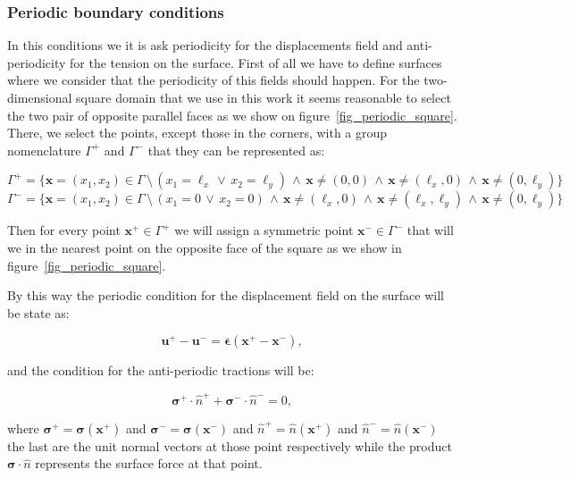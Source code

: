 \documentclass[preprint]{elsarticle}
\begin{document}
\subsubsection{Periodic boundary conditions}

In this conditions we it is ask periodicity for the displacements field and anti-periodicity for the tension on the
surface.
First of all we have to define surfaces where we consider that the periodicity of this fields should happen.
For the two-dimensional square domain that we use in this work it seems reasonable to select the two pair of opposite parallel faces 
as we show on figure~\ref{fig_periodic_square}.
There, we select the points, except those in the corners, with a group nomenclature $\Gamma^+$ and $\Gamma^-$ that they
can be represented as:

\begin{equation}
\Gamma^+ = \{ \bm{x} = (x_1, x_2) \in \Gamma \,\setminus\, (x_1 = \ell_x \,\vee\, x_2 = \ell_y) \,\wedge\,
\bm{x}\neq(0,0) \,\wedge\,  \bm{x}\neq(\ell_x,0) \,\wedge\, \bm{x}\neq(0,\ell_y) \}
\end{equation}
\begin{equation}
\Gamma^- = \{ \bm{x} = (x_1, x_2) \in \Gamma \,\setminus\, (x_1 = 0 \,\vee\, x_2 = 0) \,\wedge\,
  \bm{x}\neq(\ell_x,0) \,\wedge\, \bm{x}\neq(\ell_x,\ell_y) \,\wedge\, \bm{x}\neq(0,\ell_y) \}
\end{equation}

Then for every point $\bm{x}^+ \in \Gamma^+$ we will assign a symmetric point $\bm{x}^- \in \Gamma^-$ that will we in
the nearest point on the opposite face of the square as we show in figure~\ref{fig_periodic_square}.

By this way the periodic condition for the displacement field on the surface will be state as:

\begin{equation}
\bm{u}^+ - \bm{u}^- = \overline{\bm{\epsilon}} (\bm{x}^+ - \bm{x}^-),
\end{equation}

\noindent
and the condition for the anti-periodic tractions will be:

\begin{equation}
\bm{\sigma}^{+} \cdot\hat{n}^+ + \bm{\sigma}^{-} \cdot\hat{n}^- = 0,
\end{equation}

\noindent
where $\bm{\sigma}^{+} = \bm{\sigma}(\bm{x}^{+})$ and $\bm{\sigma}^{-} = \bm{\sigma}(\bm{x}^{-})$
and $\hat{n}^+ = \hat{n}(\bm{x}^{+})$ and $\hat{n}^- = \hat{n}(\bm{x}^{-})$ the last are the unit normal vectors 
at those point respectively while the product $\bm{\sigma}\cdot\hat{n}$ represents the surface force at that point.
\end{document}
